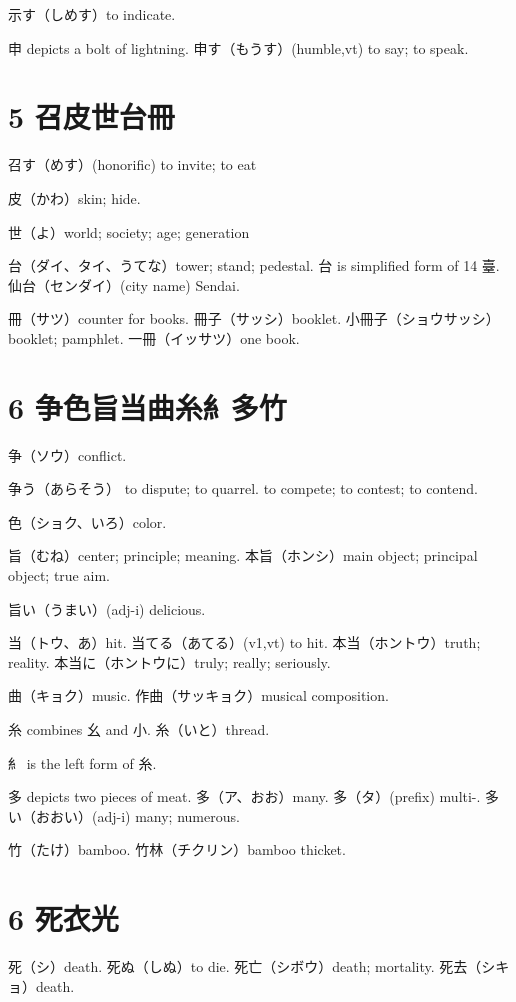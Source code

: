示す（しめす）to indicate.

申 depicts a bolt of lightning.
申す（もうす）(humble,vt) to say; to speak.

\section{5 召皮世台冊}

召す（めす）(honorific) to invite; to eat

皮（かわ）skin; hide.

世（よ）world; society; age; generation

台（ダイ、タイ、うてな）tower; stand; pedestal.
台 is simplified form of 14 臺.
仙台（センダイ）(city name) Sendai.

冊（サツ）counter for books.
冊子（サッシ）booklet.
小冊子（ショウサッシ）booklet; pamphlet.
一冊（イッサツ）one book.

\section{6 争色旨当曲糸糹多竹}

争（ソウ）conflict.

争う（あらそう）
to dispute; to quarrel.
to compete; to contest; to contend.

色（ショク、いろ）color.

旨（むね）center; principle; meaning.
本旨（ホンシ）main object; principal object; true aim.

旨い（うまい）(adj-i) delicious.

当（トウ、あ）hit.
当てる（あてる）(v1,vt) to hit.
本当（ホントウ）truth; reality.
本当に（ホントウに）truly; really; seriously.

曲（キョク）music.
作曲（サッキョク）musical composition.

糸 combines 幺 and 小.
糸（いと）thread.

糹 is the left form of 糸.

多 depicts two pieces of meat.
多（ア、おお）many.
多（タ）(prefix) multi-.
多い（おおい）(adj-i) many; numerous.

竹（たけ）bamboo.
竹林（チクリン）bamboo thicket.

\section{6 死衣光}

死（シ）death.
死ぬ（しぬ）to die.
死亡（シボウ）death; mortality.
死去（シキョ）death.

